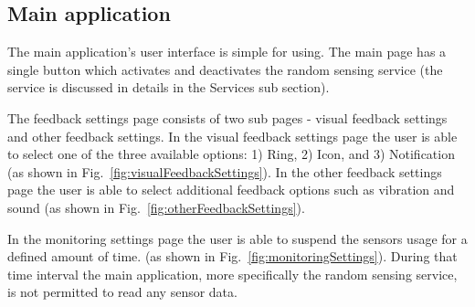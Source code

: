 \documentclass[conference, a4paper, 10pt, twocolumn]{IEEEtran}
\begin{document}
\subsection{Main application}
The main application's user interface is simple for using. The main page has a single button which activates and deactivates the random sensing service (the service is discussed in details in the Services sub section). 

The feedback settings page consists of two sub pages - visual feedback settings and other feedback settings. In the visual feedback settings page the user is able to select one of the three available options: 1) Ring, 2) Icon, and 3) Notification (as shown in Fig.~\ref{fig:visualFeedbackSettings}). In the other feedback settings page the user is able to select additional feedback options such as vibration and sound (as shown in Fig.~\ref{fig:otherFeedbackSettings}).

In the monitoring settings page the user is able to suspend the sensors usage for a defined amount of time. (as shown in Fig.~\ref{fig:monitoringSettings}). During that time interval the main application, more specifically the random sensing service, is not permitted to read any sensor data. 
\end{document}
